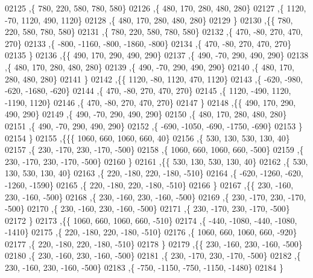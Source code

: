 \begin{DoxyCode}
02125     ,\{   780,   220,   580,   780,   580\}
02126     ,\{   480,   170,   280,   480,   280\}
02127     ,\{  1120,   -70,  1120,   490,  1120\}
02128     ,\{   480,   170,   280,   480,   280\}
02129     \}
02130    ,\{\{   780,   220,   580,   780,   580\}
02131     ,\{   780,   220,   580,   780,   580\}
02132     ,\{   470,   -80,   270,   470,   270\}
02133     ,\{  -800, -1160,  -800, -1860,  -800\}
02134     ,\{   470,   -80,   270,   470,   270\}
02135     \}
02136    ,\{\{   490,   170,   290,   490,   290\}
02137     ,\{   490,   -70,   290,   490,   290\}
02138     ,\{   480,   170,   280,   480,   280\}
02139     ,\{   490,   -70,   290,   490,   290\}
02140     ,\{   480,   170,   280,   480,   280\}
02141     \}
02142    ,\{\{  1120,   -80,  1120,   470,  1120\}
02143     ,\{  -620,  -980,  -620, -1680,  -620\}
02144     ,\{   470,   -80,   270,   470,   270\}
02145     ,\{  1120,  -490,  1120, -1190,  1120\}
02146     ,\{   470,   -80,   270,   470,   270\}
02147     \}
02148    ,\{\{   490,   170,   290,   490,   290\}
02149     ,\{   490,   -70,   290,   490,   290\}
02150     ,\{   480,   170,   280,   480,   280\}
02151     ,\{   490,   -70,   290,   490,   290\}
02152     ,\{  -690, -1050,  -690, -1750,  -690\}
02153     \}
02154    \}
02155   ,\{\{\{  1060,   660,  1060,   660,    40\}
02156     ,\{   530,   130,   530,   130,    40\}
02157     ,\{   230,  -170,   230,  -170,  -500\}
02158     ,\{  1060,   660,  1060,   660,  -500\}
02159     ,\{   230,  -170,   230,  -170,  -500\}
02160     \}
02161    ,\{\{   530,   130,   530,   130,    40\}
02162     ,\{   530,   130,   530,   130,    40\}
02163     ,\{   220,  -180,   220,  -180,  -510\}
02164     ,\{  -620, -1260,  -620, -1260, -1590\}
02165     ,\{   220,  -180,   220,  -180,  -510\}
02166     \}
02167    ,\{\{   230,  -160,   230,  -160,  -500\}
02168     ,\{   230,  -160,   230,  -160,  -500\}
02169     ,\{   230,  -170,   230,  -170,  -500\}
02170     ,\{   230,  -160,   230,  -160,  -500\}
02171     ,\{   230,  -170,   230,  -170,  -500\}
02172     \}
02173    ,\{\{  1060,   660,  1060,   660,  -510\}
02174     ,\{  -440, -1080,  -440, -1080, -1410\}
02175     ,\{   220,  -180,   220,  -180,  -510\}
02176     ,\{  1060,   660,  1060,   660,  -920\}
02177     ,\{   220,  -180,   220,  -180,  -510\}
02178     \}
02179    ,\{\{   230,  -160,   230,  -160,  -500\}
02180     ,\{   230,  -160,   230,  -160,  -500\}
02181     ,\{   230,  -170,   230,  -170,  -500\}
02182     ,\{   230,  -160,   230,  -160,  -500\}
02183     ,\{  -750, -1150,  -750, -1150, -1480\}
02184     \}

\end{DoxyCode}
